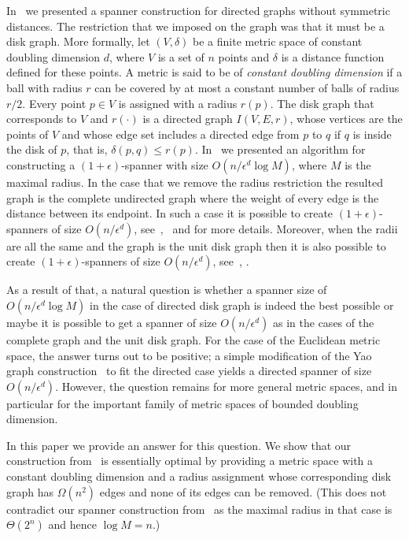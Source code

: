 \documentclass[proceedings]{stacs}
\theoremstyle{plain}\newtheorem{satz}[thm]{Satz}
\theoremstyle{definition}\newtheorem{crucial}[thm]{Crucial Definition}
\newcommand{\eps}{\epsilon}
\begin{document}
In~\cite{PeRo08} we presented a spanner construction for directed
graphs without symmetric distances. The restriction that we
imposed on the graph was that it must be a disk graph. More
formally, let $(V,\delta)$ be a finite metric space of constant
doubling dimension $d$, where $V$ is a set of $n$ points and
$\delta$ is a distance function defined for these points. A metric
is said to be of {\em constant doubling dimension} if a ball with
radius $r$ can be covered by at most a constant number of balls of
radius $r/2$. Every point $p\in V$ is assigned with a radius
$r(p)$. The disk graph that corresponds to $V$ and $r(\cdot)$ is a
directed graph $I(V,E,r)$, whose vertices are the points of $V$
and whose edge set includes a directed edge from $p$ to $q$ if $q$
is inside the disk of $p$, that is, $\delta(p,q)\leq r(p)$.
In~\cite{PeRo08} we presented an algorithm for constructing a
$(1+\eps)$-spanner with size $O(n/\eps^d \log M)$, where $M$ is
the maximal radius. In the case that we remove the radius
restriction the resulted graph is the complete undirected graph
where the weight of every edge is the distance between its
endpoint. In such a case it is possible to create
$(1+\eps)$-spanners of size $O(n/\eps^d)$,
see~\cite{HaMe06},~\cite{GaoGuiNgu04} and \cite{Ro07b} for more
details. Moreover, when the radii are all the same and the graph
is the unit disk graph then it is also possible to create
$(1+\eps)$-spanners of size $O(n/\eps^d)$,
see~\cite{gao05geometric}, \cite{PeRo08}.

As a result of that, a natural question is whether a spanner size
of $O(n/\eps^d \log M)$ in the case of directed disk graph is
indeed the best possible or maybe it is possible to get a spanner
of size $O(n/\eps^d)$ as in the cases of the complete graph and
the unit disk graph. For the case of the Euclidean metric space,
the answer turns out to be positive; a simple modification of the
Yao graph construction~\cite{Yao82} to fit the directed case
yields a directed spanner of size $O(n/\eps^d)$. However, the
question remains for more general metric spaces, and in particular
for the important family of metric spaces of bounded doubling
dimension.

In this paper we provide an answer for this question. We show that
our construction from~\cite{PeRo08} is essentially optimal by
providing a metric space with a constant doubling dimension and a
radius assignment whose corresponding disk graph has $\Omega(n^2)$
edges and none of its edges can be removed. (This does not
contradict our spanner construction from~\cite{PeRo08} as the
maximal radius in that case is $\Theta(2^n)$ and hence $\log M =
n$.)
\end{document}
